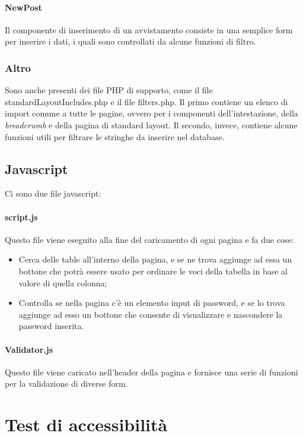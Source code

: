 \documentclass[12pt, a4paper]{article}
\begin{document}
\paragraph{NewPost}
Il componente di inserimento di un avvistamento consiste in una semplice form per inserire i dati, i quali sono controllati da alcune funzioni di filtro.
\subsubsection{Altro}
Sono anche presenti dei file PHP di supporto, come il file standardLayoutIncludes.php e il file filters.php. Il primo contiene un elenco di import comune a tutte le pagine, ovvero per i componenti dell'intestazione, della \textit{breadcrumb} e della pagina di standard layout. Il secondo, invece, contiene alcune funzioni utili per filtrare le stringhe da inserire nel database. 
\subsection{Javascript}
Ci sono due file javascript: 
\paragraph{script.js} Questo file viene eseguito alla fine del caricamento di ogni pagina e fa due cose:
\begin{itemize}
\item Cerca delle table all'interno della pagina, e se ne trova aggiunge ad essa un bottone che potrà essere usato per ordinare le voci della tabella in base al valore di quella colonna;
\item Controlla se nella pagina c'è un elemento input di password, e se lo trova aggiunge ad esso un bottone che consente di visualizzare e nascondere la password inserita.
\end{itemize}
\paragraph{Validator.js} Questo file viene caricato nell'header della pagina e fornisce una serie di funzioni per la validazione di diverse form.

\section{Test di accessibilità}
\end{document}
